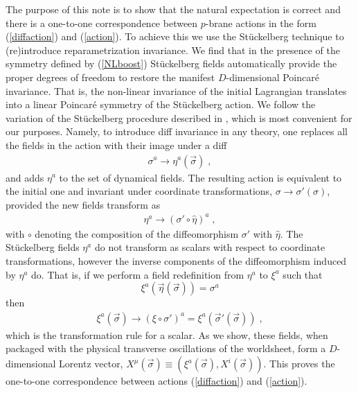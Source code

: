 \documentclass[%
 reprint,
 amsmath,amssymb,
 aps,
]{revtex4-1}
\begin{document}
The purpose of this note is to show that the natural expectation is correct and there is a one-to-one correspondence between $p$-brane actions
in the form (\ref{diffaction}) and (\ref{action}).
To achieve this we use the St\"uckelberg technique
to (re)introduce reparametrization invariance.
 We find that in the presence of the symmetry defined by (\ref{NLboost}) St\"uckelberg fields automatically provide the proper degrees of freedom to restore the
manifest $D$-dimensional Poincar\'e invariance. That is, the non-linear invariance of the initial
Lagrangian translates into a linear Poincar\'e symmetry of the St\"uckelberg action.
We follow the variation of the St\"uckelberg procedure described in
\cite{Dubovsky:2004sg}, which is most convenient for our purposes.
Namely, to introduce  diff invariance in any theory, one
replaces all the fields in the action with their image under a diff
\begin{eqnarray}
    \sigma^{a} \rightarrow \eta^{a}(\vec{\sigma}) \; , \nonumber
\end{eqnarray}
and adds $\eta^a$ to the set of dynamical fields. The resulting action is equivalent to the initial one and invariant under
coordinate transformations, $\sigma \rightarrow \sigma'(\sigma)$, provided the new fields transform as
\begin{eqnarray}
    \eta^{a} \rightarrow \left( \sigma' \circ \hat{\eta} \right)^{a} \; , \nonumber
\end{eqnarray}
with $\circ$ denoting the composition of the diffeomorphism $\sigma'$ with $\hat{\eta}$.
The St\"uckelberg fields $\eta^a$  do not transform as scalars with respect to coordinate transformations,
however  the inverse components of the diffeomorphism induced by $\eta^a$ do.  That is,
if we perform a field redefinition from $\eta^a$ to $\xi^{a}$ such that
\begin{equation}
\label{etadef}
\xi^{a}(\vec{\eta}(\vec{\sigma})) = \sigma^{a}
\end{equation}
 then
\begin{eqnarray}
    \xi^{a}(\vec{\sigma}) \rightarrow \left( \xi \circ \sigma' \right)^{a} = \xi^a(\vec{\sigma}'(\vec{\sigma})) \nonumber \; ,
\end{eqnarray}
which is the transformation rule for a scalar.
As we show, these fields, when packaged with the physical transverse oscillations
of the worldsheet, form a $D$-dimensional Lorentz vector,
$X^{\mu}(\vec{\sigma}) \equiv (\xi^a(\vec{\sigma}),X^i(\vec{\sigma}))$.
This proves the one-to-one correspondence between actions (\ref{diffaction}) and (\ref{action}).
\end{document}
